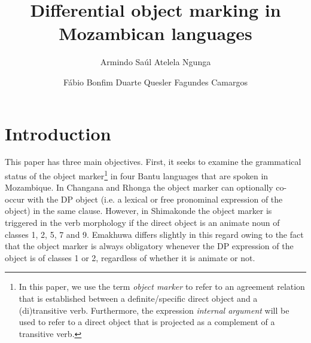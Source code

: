 \documentclass[output=paper]{langsci/langscibook}
\title{Differential object marking in Mozambican languages}
\author{%
Armindo Saúl Atelela Ngunga\affiliation{University of Eduardo Mondlane}\and 
Fábio Bonfim Duarte\affiliation{Federal University of Minas Gerais}\lastand 
 Quesler Fagundes Camargos \affiliation{Federal University of Rondônia}
}
\begin{document}
 

 

 

 

 


 
 

\section{Introduction}

This paper has three main objectives. First, it seeks to examine the grammatical status of the object marker\footnote{ {In this paper, we use the term }{\textit{object marker}} {to refer to an agreement relation that is established between a definite/specific direct object and a (di)transitive verb. Furthermore, the expression }{\textit{internal argument}} {will be used to refer to a direct object that is projected as a complement of a transitive verb.}} in four Bantu languages that are spoken in Mozambique. In Changana and Rhonga the object marker can optionally co-occur with the DP object (i.e. a lexical or free pronominal expression of the object) in the same clause. However, in Shimakonde the object marker is triggered in the verb morphology if the direct object is an animate noun of classes 1, 2, 5, 7 and 9. Emakhuwa differs slightly in this regard owing to the fact that the object marker is always obligatory whenever the DP expression of the object is of classes 1 or 2, regardless of whether it is animate or not.
\end{document}
